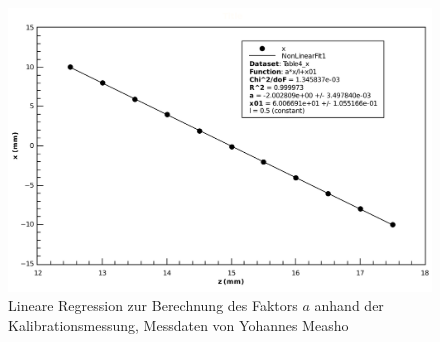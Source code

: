\begin{figure}[H]
    \center
    \includegraphics[width=.8\textwidth]{images/ym-x-z-fit-a.pdf}
    \caption{Lineare Regression zur Berechnung des Faktors $a$ anhand der Kalibrationsmessung, Messdaten von Yohannes Measho}
    \label{fig:ym-x-z-fit-a}
\end{figure}


